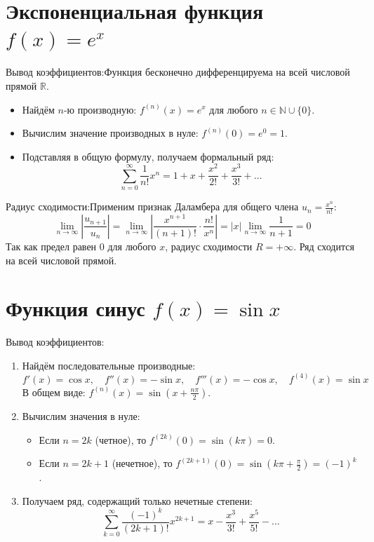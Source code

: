\documentclass[14pt]{extreport}
\begin{document}
    \section{Экспоненциальная функция $f(x) = e^x$}
    Вывод коэффициентов:Функция бесконечно дифференцируема на всей числовой прямой $\mathbb{R}$.
    \begin{itemize}
        \item Найдём $n$-ю производную: $f^{(n)}(x) = e^x$ для любого $n \in \mathbb{N} \cup \{0\}$.
        \item Вычислим значение производных в нуле: $f^{(n)}(0) = e^0 = 1$.
        \item Подставляя в общую формулу, получаем формальный ряд:$$\sum_{n=0}^{\infty} \frac{1}{n!} x^n = 1 + x + \frac{x^2}{2!} + \frac{x^3}{3!} + \dots$$
    \end{itemize}
    Радиус сходимости:Применим признак Даламбера для общего члена $u_n = \frac{x^n}{n!}$:$$\lim_{n \to \infty} \left| \frac{u_{n+1}}{u_n} \right| = \lim_{n \to \infty} \left| \frac{x^{n+1}}{(n+1)!} \cdot \frac{n!}{x^n} \right| = |x| \lim_{n \to \infty} \frac{1}{n+1} = 0$$Так как предел равен $0$ для любого $x$, радиус сходимости $R = +\infty$. Ряд сходится на всей числовой прямой.

    \section{Функция синус $f(x) = \sin x$}

    Вывод коэффициентов:
    \begin{enumerate}
        \item Найдём последовательные производные:$$f'(x) = \cos x, \quad f''(x) = -\sin x, \quad f'''(x) = -\cos x, \quad f^{(4)}(x) = \sin x$$
        В общем виде: $f^{(n)}(x) = \sin\left(x + \frac{n\pi}{2}\right)$.
        \item Вычислим значения в нуле:
        \begin{itemize}
            \item Если $n = 2k$ (четное), то $f^{(2k)}(0) = \sin(k\pi) = 0$.
            \item Если $n = 2k+1$ (нечетное), то $f^{(2k+1)}(0) = \sin\left(k\pi + \frac{\pi}{2}\right) = (-1)^k$.
        \end{itemize}
        \item Получаем ряд, содержащий только нечетные степени:$$\sum_{k=0}^{\infty} \frac{(-1)^k}{(2k+1)!} x^{2k+1} = x - \frac{x^3}{3!} + \frac{x^5}{5!} - \dots$$
    \end{enumerate}
\end{document}
